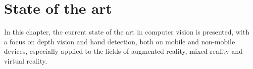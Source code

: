\chapter{State of the art}\label{ch:state-of-the-art}
In this chapter, the current state of the art in computer vision is presented,
with a focus on depth vision and hand detection, both on mobile and non-mobile devices,
especially applied to the fields of augmented reality, mixed reality and virtual reality.










